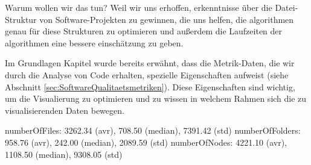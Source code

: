 Warum wollen wir das tun? Weil wir uns erhoffen, erkenntnisse über die Datei-Struktur von Software-Projekten zu gewinnen, die uns helfen, die algorithmen genau für diese Strukturen zu optimieren und außerdem die Laufzeiten der algorithmen eine bessere einschätzung zu geben.

Im Grundlagen Kapitel wurde bereits erwähnt, dass die Metrik-Daten, die wir durch die Analyse von Code erhalten, spezielle Eigenschaften aufweist (siehe Abschnitt \ref{sec:SoftwareQualitaetsmetriken}). Diese Eigenschaften sind wichtig, um die Visualierung zu optimieren und zu wissen in welchem Rahmen sich die zu visualisierenden Daten bewegen. 

numberOfFiles: 3262.34 (avr), 708.50 (median), 7391.42 (std)
numberOfFolders: 958.76 (avr), 242.00 (median), 2089.59 (std)
numberOfNodes: 4221.10 (avr), 1108.50 (median), 9308.05 (std)